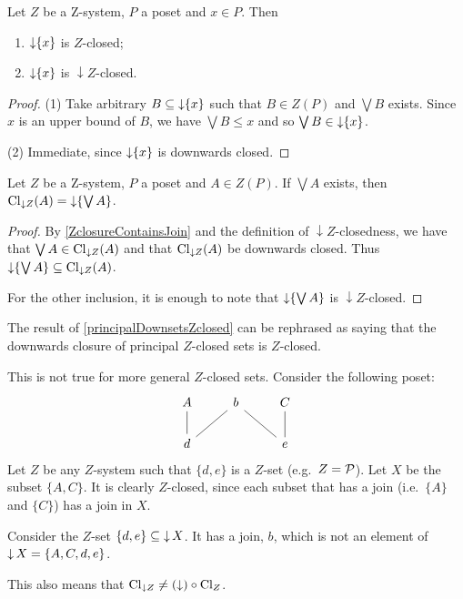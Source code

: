 \begin{lemma} \label{principalDownsetsZclosed}
Let $Z$ be a $\mathrm{Z}$-system, $P$ a poset and $x\in P$. Then
\begin{enumerate}
\item $\operatorname{\downarrow}\{x\}$ is $Z$-closed;
\item $\operatorname{\downarrow}\{x\}$ is ${\downarrow}Z$-closed.
\end{enumerate}
\end{lemma}
\begin{proof}
(1) Take arbitrary $B\subseteq \operatorname{\downarrow}\{x\}$ such that $B\in Z(P)$ and $\bigvee B$ exists. Since $x$ is an upper bound of $B$, we have $\bigvee B\leq x$ and so $\bigvee B \in \operatorname{\downarrow}\{x\}$.

(2) Immediate, since $\operatorname{\downarrow}\{x\}$ is downwards closed.
\end{proof}
\begin{corollary} \label{closureZsetWithJoin}
Let $Z$ be a $\mathrm{Z}$-system, $P$ a poset and $A\in Z(P)$. If $\bigvee A$ exists, then $\operatorname{Cl}_{\downarrow Z}(A) = \operatorname{\downarrow}\{\bigvee A\}$.
\end{corollary}
\begin{proof}
By \ref{ZclosureContainsJoin} and the definition of ${\downarrow}Z$-closedness, we have that $\bigvee A\in \operatorname{Cl}_{\downarrow Z}(A)$ and that $\operatorname{Cl}_{\downarrow Z}(A)$ be downwards closed. Thus $\operatorname{\downarrow}\{\bigvee A\} \subseteq \operatorname{Cl}_{\downarrow Z}(A)$.

For the other inclusion, it is enough to note that $\operatorname{\downarrow}\{\bigvee A\}$ is ${\downarrow}Z$-closed.
\end{proof}

\begin{example}
The result of \ref{principalDownsetsZclosed} can be rephrased as saying that the downwards closure of principal $Z$-closed sets is $Z$-closed.

This is not true for more general $Z$-closed sets. Consider the following poset:
\[ \begin{tikzcd}
A \ar[d, dash] & b \ar[dl, dash] \ar[dr, dash] & C \ar[d, dash] \\
d & {} & e
\end{tikzcd} \]
Let $Z$ be any $Z$-system such that $\{d,e\}$ is a $Z$-set (e.g.\ $Z = \operatorname{\mathcal{P}}$).
Let $X$ be the subset $\{A,C\}$. It is clearly $Z$-closed, since each subset that has a join (i.e.\ $\{A\}$ and $\{C\}$) has a join in $X$.

Consider the $Z$-set $\{d,e\} \subseteq \operatorname{\downarrow} X$. It has a join, $b$, which is not an element of $\operatorname{\downarrow} X = \{A,C,d,e\}$.

This also means that $\operatorname{Cl}_{\downarrow Z} \neq (\downarrow) \circ \operatorname{Cl}_Z$.
\end{example}

